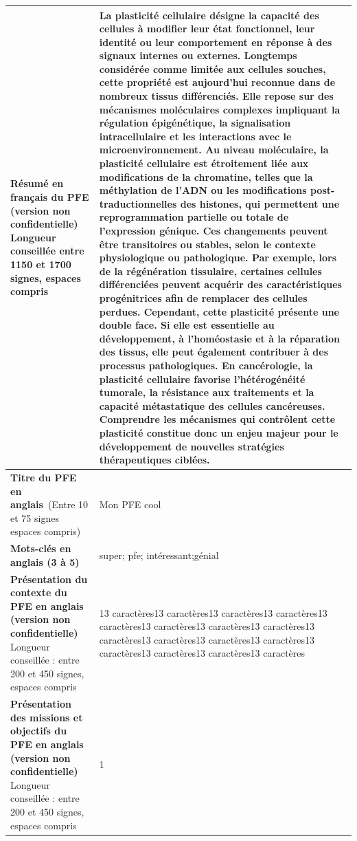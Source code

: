 \documentclass[12pt,a4paper]{article}
\begin{document}
\begin{longtable}{|p{7cm}|p{9cm}|}
    \textbf{Résumé en français du PFE (version non confidentielle)} Longueur conseillée entre 1150 et 1700 signes, espaces compris & La plasticité cellulaire désigne la capacité des cellules à modifier leur état fonctionnel, leur identité ou leur comportement en réponse à des signaux internes ou externes. Longtemps considérée comme limitée aux cellules souches, cette propriété est aujourd’hui reconnue dans de nombreux tissus différenciés. Elle repose sur des mécanismes moléculaires complexes impliquant la régulation épigénétique, la signalisation intracellulaire et les interactions avec le microenvironnement.  Au niveau moléculaire, la plasticité cellulaire est étroitement liée aux modifications de la chromatine, telles que la méthylation de l’ADN ou les modifications post-traductionnelles des histones, qui permettent une reprogrammation partielle ou totale de l’expression génique. Ces changements peuvent être transitoires ou stables, selon le contexte physiologique ou pathologique. Par exemple, lors de la régénération tissulaire, certaines cellules différenciées peuvent acquérir des caractéristiques progénitrices afin de remplacer des cellules perdues.  Cependant, cette plasticité présente une double face. Si elle est essentielle au développement, à l’homéostasie et à la réparation des tissus, elle peut également contribuer à des processus pathologiques. En cancérologie, la plasticité cellulaire favorise l’hétérogénéité tumorale, la résistance aux traitements et la capacité métastatique des cellules cancéreuses. Comprendre les mécanismes qui contrôlent cette plasticité constitue donc un enjeu majeur pour le développement de nouvelles stratégies thérapeutiques ciblées. \\ \hline
    \textbf{Titre du PFE en anglais} (Entre 10 et 75 signes espaces compris) & Mon PFE cool \\ \hline
    \textbf{Mots-clés en anglais (3 à 5)} & super; pfe; intéressant;génial \\ \hline
    \textbf{Présentation du contexte du PFE en anglais (version non confidentielle)} Longueur conseillée : entre 200 et 450 signes, espaces compris & 13 caractères13 caractères13 caractères13 caractères13 caractères13 caractères13 caractères13 caractères13 caractères13 caractères13 caractères13 caractères13 caractères13 caractères13 caractères13 caractères \\ \hline
    \textbf{Présentation des missions et objectifs du PFE en anglais (version non confidentielle)} Longueur conseillée : entre 200 et 450 signes, espaces compris & 1 \\ \hline

\end{longtable}
\end{document}
